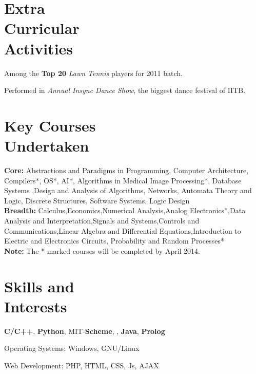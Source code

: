 \documentclass[margin,11pt]{resume}
\begin{document}
\begin{resume}
\section{\mysidestyle Extra \\ Curricular \\ Activities }
\begin{list2}
\item Among the \textbf{Top 20} \emph{Lawn Tennis} players for 2011 batch.
\item Performed in \emph{Annual Insync Dance Show}, the biggest dance festival of IITB.
\end{list2}
\section{\mysidestyle Key Courses\\Undertaken}

\textbf{Core:} 
Abstractions and Paradigms in Programming, Computer Architecture, Compilers*, OS*, AI*, Algorithms in Medical Image Processing*, Database Systems ,Design and Analysis of Algorithms, Networks, Automata Theory and Logic, Discrete Structures, Software Systems, Logic Design\\
\textbf{Breadth:} 
Calculus,Economics,Numerical Analysis,Analog Electronics*,Data Analysis and Interpretation,Signals and Systems,Controls and Communications,Linear Algebra and Differential Equations,Introduction to Electric and Electronics Circuits, Probability and Random Processes* \\
\textbf{Note:} The * marked courses will be completed by April 2014.

\section{\mysidestyle Skills and\\Interests} 
\begin{list2}
\item \textbf{C/C++}, \textbf{Python}, MIT-\textbf{Scheme}, \LaTeXe, \textbf{Java}, \textbf{Prolog}
\item Operating Systems: Windows, GNU/Linux
\item  Web Development: PHP, HTML, CSS, Js, AJAX
\end{list2}

\end{resume}
\end{document}
